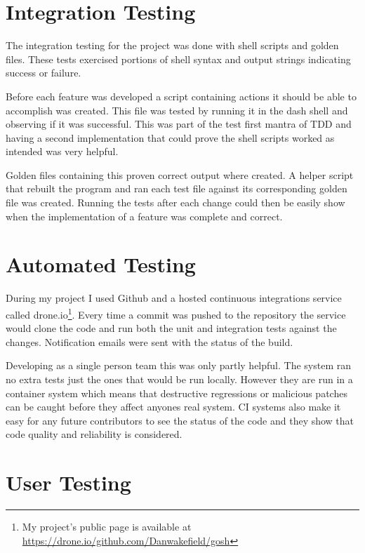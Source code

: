 \section{Integration Testing}
The integration testing for the project was done with shell scripts and golden files.
These tests exercised portions of shell syntax and output strings indicating success or failure.

Before each feature was developed a script containing actions it should be able to accomplish was created.
This file was tested by running it in the dash shell and observing if it was successful.
This was part of the test first mantra of TDD and having a second implementation that could prove the shell scripts worked as intended was very helpful.

Golden files containing this proven correct output where created.
A helper script that rebuilt the program and ran each test file against its corresponding golden file was created.
Running the tests after each change could then be easily show when the implementation of a feature was complete and correct.

\section{Automated Testing}
During my project I used Github and a hosted continuous integrations service called drone.io\footnote{My project's public page is available at \url{https://drone.io/github.com/Danwakefield/gosh}}.
Every time a commit was pushed to the repository the service would clone the code and run both the unit and integration tests against the changes.
Notification emails were sent with the status of the build.

Developing as a single person team this was only partly helpful.
The system ran no extra tests just the ones that would be run locally.
However they are run in a container system which means that destructive regressions or malicious patches can be caught before they affect anyones real system. 
CI systems also make it easy for any future contributors to see the status of the code and they show that code quality and reliability is considered.

\section{User Testing}
















